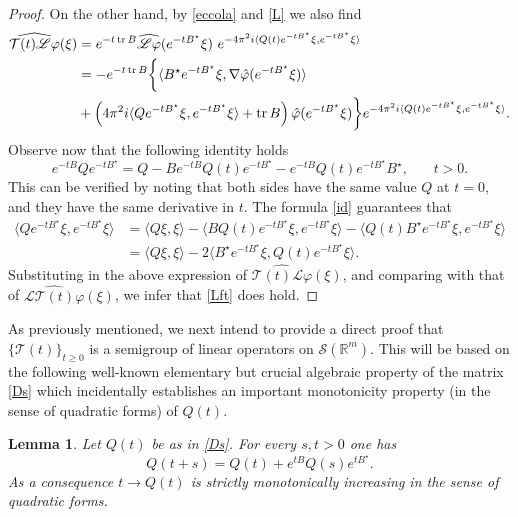 \documentclass[11pt,a4paper]{amsart}
\def \vf{\varphi}
\newcommand{\Rm}{\mathbb R^m}
\numberwithin{equation}{section}
\newcommand{\tr}{\operatorname{tr}}
\newcommand{\sa}{\langle}
\newcommand{\da}{\rangle}
\newtheorem{lemma}[theorem]{Lemma}
\numberwithin{equation}{section}
\begin{document}
\begin{proof}
On the other hand, by \eqref{eccola} and \eqref{L} we also find
\begin{align}\label{commu}
 \widehat{\mathcal T(t) \mathscr L  \vf}(\xi) & = e^{-t \tr B} \widehat{\mathscr L  \vf}(e^{-tB^\star}\xi) \  e^{-4\pi^2 i  \sa Q(t) e^{-tB^\star}\xi,e^{-tB^\star}\xi\da}
\\
& = - e^{-t \tr B} \bigg\{\sa B^\star e^{-tB^\star}\xi, \nabla \hat \vf(e^{-tB^\star}\xi)\da 
\notag\\
& + \left(4 \pi^2 i \sa Qe^{-tB^\star}\xi,e^{-tB^\star}\xi\da + \tr B\right) \hat \vf(e^{-tB^\star}\xi)\bigg\} e^{-4\pi^2 i  \sa Q(t) e^{-tB^\star}\xi,e^{-tB^\star}\xi\da}.
\notag\end{align}
Observe now that the following identity holds
\begin{equation}\label{id} 
e^{-tB}Q e^{-tB^\star}= Q  - B e^{-tB} Q(t) e^{-tB^\star} - e^{-tB} Q(t) e^{-tB^\star} B^\star,\ \ \ \ \ \ \ \ t>0.
\end{equation}
This can be verified by noting that both sides have the same value $Q$ at $t = 0$, and they have the same derivative in $t$. 
The formula \eqref{id} guarantees that
\begin{align*}
\sa Qe^{-tB^\star}\xi,e^{-tB^\star}\xi\da & = \sa Q\xi,\xi\da - \sa B Q(t)e^{-tB^\star}\xi,e^{-tB^\star}\xi\da - \sa Q(t) B^\star e^{-tB^\star}\xi,e^{-tB^\star}\xi\da
\\
& = \sa Q\xi,\xi\da - 2 \sa B^\star e^{-tB^\star} \xi, Q(t) e^{-tB^\star}\xi\da.
\end{align*}
Substituting in the above expression of  $\widehat{\mathcal T(t) \mathscr L  \vf}(\xi)$, and comparing with that of $\widehat{\mathscr L \mathcal T(t) \vf}(\xi)$, we infer that \eqref{Lft} does hold.


\end{proof}

As previously mentioned, we next intend to provide a direct proof that $\{\mathcal T(t)\}_{t\ge 0}$ is a semigroup of linear operators on $\mathscr S(\Rm)$. This will be based on the following well-known elementary but crucial algebraic property of the matrix \eqref{Ds} which incidentally establishes an important monotonicity property (in the sense of quadratic forms) of $Q(t)$.

\begin{lemma}\label{L:Q}
Let $Q(t)$ be as in \eqref{Ds}. For every $s, t >0$ one has
\[
Q(t+s) = Q(t) + e^{tB} Q(s) e^{tB^\star}.
\]
As a consequence $t\to Q(t)$ is strictly monotonically increasing in the sense of quadratic forms. 
\end{lemma}
\end{document}
